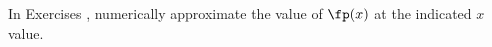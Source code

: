 {\noindent In Exercises}
{, numerically approximate the value of $\fp(x)$ at the indicated $x$ value.
}
